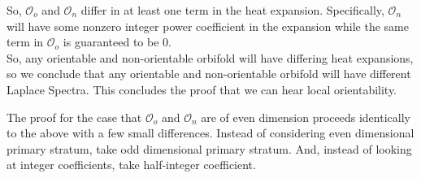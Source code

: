 \documentclass{amsart}
\theoremstyle{plain}
\theoremstyle{definition}
\theoremstyle{remark}
\newcommand{\orb}{\mathcal O}
\begin{document}
So, $\orb_o$ and $\orb_n$ differ in at least one term in the heat
expansion. Specifically, $\orb_n$ will have some nonzero integer power
coefficient in the expansion while the same term in $\orb_o$ is guaranteed
to be $0$.\\

So, any orientable and non-orientable orbifold will have differing heat
expansions, so we conclude that any orientable and non-orientable orbifold
will have different Laplace Spectra. This concludes the proof that we can
hear local orientability.

The proof for the case that $\orb_o$ and $\orb_n$ are of even dimension
proceeds identically to the above with a few small differences. Instead of
considering even dimensional primary stratum, take odd dimensional primary
stratum. And, instead of looking at integer coefficients, take half-integer
coefficient.
\end{document}
